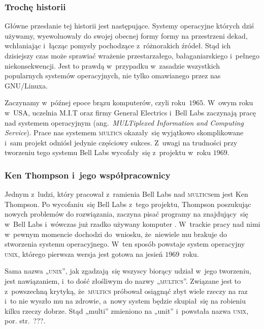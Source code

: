\documentclass[10pt,t]{beamer}
\begin{document}
\begin{frame}
  \frametitle{Trochę historii}


  Główne przesłanie tej historii jest następujące. Systemy operacyjne
  których dziś używamy, wyewoluowały do swojej obecnej formy formy
  na przestrzeni dekad, wchłaniając i~łącząc pomysły pochodzące
  z~różnorakich źródeł. Stąd ich dzisiejszy czas może sprawiać wrażenie
  przestarzałego, bałaganiarskiego i~pełnego niekonsekwencji. Jest to prawdą
  w~przypadku w~zasadzie wszystkich popularnych systemów operacyjnych, nie
  tylko omawianego przez nas GNU/Linuxa.

  Zaczynamy w~późnej epoce brązu komputerów, czyli roku~$1965$.
  W~owym roku w~USA, uczelnia M.I.T oraz firmy General Electrics i~Bell
  Labs zaczynają pracę nad systemem operacyjnym
  (ang.~\textit{MULTiplexed Information and Computing Service}). Prace
  nas systemem \textsc{multics} okazały~się wyjątkowo skomplikowane i~sam
  projekt odniósł jedynie częściowy sukces. Z~uwagi na trudności
  przy tworzeniu tego systemu Bell Labs wycofały~się z~projektu
  w~roku $1969$.

\end{frame}





\begin{frame}
  \frametitle{Ken Thompson i~jego współpracownicy}


  Jednym z~ludzi, który pracował z~ramienia Bell Labs nad \textsc{multics}em
  jest 
  {Ken Thompson}. Po wycofaniu~się Bell Labs z~tego projektu, Thompson
  poszukując nowych problemów do rozwiązania, zaczyna pisać programy na
  znajdujący~się w~Bell Labs i~wówczas już rzadko używany komputer
  .
  W~trackie pracy nad nimi w~pewnym momencie dochodzi do~wniosku,
  że~niewiele mu brakuje do stworzenia systemu operacyjnego. W~ten sposób
  powstaje system operacyjny \textsc{unix}, którego pierwsza wersja
  jest gotowa na jesień $1969$~roku.

  Sama nazwa „\textsc{unix}”,
  jak zgadzają~się wszyscy biorący udział w~jego tworzeniu, jest
  nawiązaniem, i~to dość złośliwym do nazwy „\textsc{multics}”.
  Związane jest to z~powszechną krytyką, że~\textsc{multics} próbował
  osiągnąć zbyt wiele rzeczy na raz i~to nie wyszło mu na zdrowie,
  a~nowy system będzie skupiał~się na robieniu kilku rzeczy dobrze. Stąd
  „multi” zmieniono na „unit” i~powstała nazwa \textsc{unix}, por.
  str.~???.

\end{frame}
\end{document}
